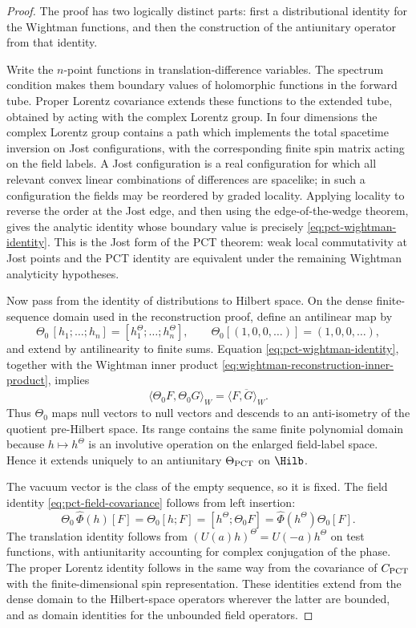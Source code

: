 \begin{proof}
The proof has two logically distinct parts: first a distributional identity
for the Wightman functions, and then the construction of the antiunitary
operator from that identity.

Write the \(n\)-point functions in translation-difference variables.  The
spectrum condition makes them boundary values of holomorphic functions in the
forward tube.  Proper Lorentz covariance extends these functions to the
extended tube, obtained by acting with the complex Lorentz group.  In four
dimensions the complex Lorentz group contains a path which implements the
total spacetime inversion on Jost configurations, with the corresponding
finite spin matrix acting on the field labels.  A Jost configuration is a real
configuration for which all relevant convex linear combinations of differences
are spacelike; in such a configuration the fields may be reordered by graded
locality.  Applying locality to reverse the order at the Jost edge, and then
using the edge-of-the-wedge theorem, gives the analytic identity whose
boundary value is precisely \eqref{eq:pct-wightman-identity}.  This is the
Jost form of the PCT theorem: weak local commutativity at Jost points and the
PCT identity are equivalent under the remaining Wightman analyticity
hypotheses.

Now pass from the identity of distributions to Hilbert space.  On the dense
finite-sequence domain used in the reconstruction proof, define an antilinear
map by
\[
  \Theta_0\,
  [h_1;\ldots;h_n]
  =
  [h_1^\Theta;\ldots;h_n^\Theta],
  \qquad
  \Theta_0[(1,0,0,\ldots)]=(1,0,0,\ldots),
\]
and extend by antilinearity to finite sums.  Equation
\eqref{eq:pct-wightman-identity}, together with the Wightman inner product
\eqref{eq:wightman-reconstruction-inner-product}, implies
\[
  \langle \Theta_0 F,\Theta_0 G\rangle_W
  =
  \overline{\langle F,G\rangle_W}.
\]
Thus \(\Theta_0\) maps null vectors to null vectors and descends to an
anti-isometry of the quotient pre-Hilbert space.  Its range contains the same
finite polynomial domain because \(h\mapsto h^\Theta\) is an involutive
operation on the enlarged field-label space.  Hence it extends uniquely to an
antiunitary \(\Theta_{\rm PCT}\) on \(\Hilb\).

The vacuum vector is the class of the empty sequence, so it is fixed.  The
field identity \eqref{eq:pct-field-covariance} follows from left insertion:
\[
  \Theta_0\,\widehat\Phi(h)[F]
  =
  \Theta_0[h;F]
  =
  [h^\Theta;\Theta_0F]
  =
  \widehat\Phi(h^\Theta)\Theta_0[F].
\]
The translation identity follows from
\((U(a)h)^\Theta=U(-a)h^\Theta\) on test functions, with antiunitarity
accounting for complex conjugation of the phase.  The proper Lorentz identity
follows in the same way from the covariance of \(C_{\rm PCT}\) with the
finite-dimensional spin representation.  These identities extend from the
dense domain to the Hilbert-space operators wherever the latter are bounded,
and as domain identities for the unbounded field operators.
\end{proof}

